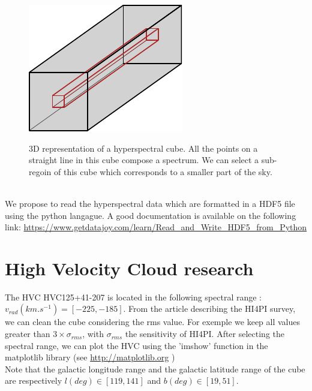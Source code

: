 \documentclass[a4paper,10.5pt]{report}
\begin{document}
\begin{figure}[h!]
  \centering
  \includegraphics[width=3.in]{hyperspectral.pdf}
  \label{fig::hyperspectral}
  \caption{3D representation of a hyperspectral cube. All the points on a straight line in this cube compose a spectrum.
  We can select a sub-regoin of this cube which corresponds to a smaller part of the sky.}
\end{figure} \\

We propose to read the hyperspectral data which are formatted in a HDF5 file using the python langague.
A good documentation is available on the following link: 
\color{blue} \url{https://www.getdatajoy.com/learn/Read_and_Write_HDF5_from_Python} \color{black}

\section{High Velocity Cloud research}
The HVC HVC125+41-207 is located in the following spectral range : $v_{rad} (km.s^{-1}) = [-225, -185]$. 
From the article describing the HI4PI survey, we can clean the cube considering the rms value. For exemple we keep 
all values greater than $3 \times \sigma_{rms}$, with $\sigma_{rms}$ the sensitivity of HI4PI.
After selecting the spectral range, we can plot the HVC using the 'imshow' function in the matplotlib library 
(see \color{blue} \url{http://matplotlib.org} \color{black}) \\

Note that the galactic longitude range and the galactic latitude range of the cube are respectively
$l(deg) \in [119, 141]$ and $b(deg) \in [19, 51]$.
\end{document}
